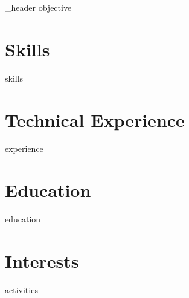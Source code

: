 \documentclass[letter,10pt]{article}
\author{Marvin Taschenberger }
\begin{document}
    {_header}
    {objective}
    \vspace{1em}
    \section{Skills}
    {skills}
    \vspace{1em}
    \section{Technical Experience}
    {experience}
    \vspace{1em}
    \section{Education}
    {education}
    \vspace{1em}
    \section{Interests}
    {activities}
\end{document}
